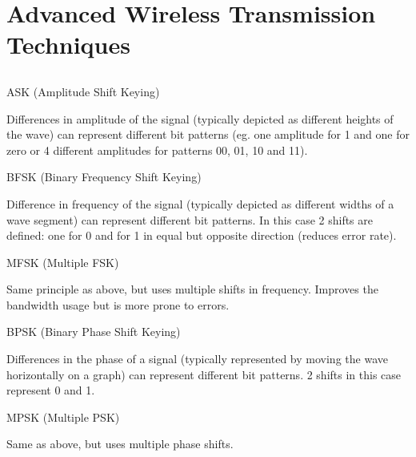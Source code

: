 \documentclass[12pt]{article}
\newcommand{\exercise}{\subsection{}\setcounter{subsubsection}{0}}
\begin{document}
\section*{Advanced Wireless Transmission Techniques}
\exercise
\begin{itemize}
    \begin{minipage}{\textwidth}
    \item ASK (Amplitude Shift Keying)

    Differences in amplitude of the signal (typically depicted as different heights of the wave) can represent different bit patterns (eg. one amplitude for 1 and one for zero or 4 different amplitudes for patterns 00, 01, 10 and 11).
    \end{minipage}

    \begin{minipage}{\textwidth}
    \item BFSK (Binary Frequency Shift Keying)

    Difference in frequency of the signal (typically depicted as different widths of a wave segment) can represent different bit patterns. In this case 2 shifts are defined: one for 0 and for 1 in equal but opposite direction (reduces error rate).
    \end{minipage}

    \begin{minipage}{\textwidth}
    \item MFSK (Multiple FSK)

    Same principle as above, but uses multiple shifts in frequency. Improves the bandwidth usage but is more prone to errors.
    \end{minipage}

    \begin{minipage}{\textwidth}
    \item BPSK (Binary Phase Shift Keying)

    Differences in the phase of a signal (typically represented by moving the wave horizontally on a graph) can represent different bit patterns. 2 shifts in this case represent 0 and 1.
    \end{minipage}

    \begin{minipage}{\textwidth}
    \item MPSK (Multiple PSK)

    Same as above, but uses multiple phase shifts.
    \end{minipage}
\end{itemize}
\end{document}
